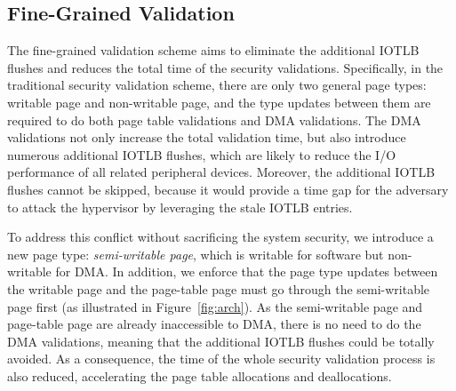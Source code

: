 \subsection{Fine-Grained Validation}\label{sec:fine-grained}
The fine-grained validation scheme aims to eliminate the additional IOTLB flushes and reduces the total time of the security validations.
Specifically, in the traditional security validation scheme, there are only two general page types: writable page and non-writable page,
and the type updates between them are required to do both page table validations and DMA validations.
The DMA validations not only increase the total validation time, but also introduce numerous additional IOTLB flushes, which are likely to reduce the I/O performance of all related peripheral devices.
Moreover, the additional IOTLB flushes cannot be skipped, because it would provide a time gap for the adversary to attack the hypervisor by leveraging the stale IOTLB entries.

To address this conflict without sacrificing the system security, we introduce a new page type: \emph{semi-writable page}, which is writable for software but non-writable for DMA.
In addition, we enforce that the page type updates between the writable page and the page-table page must go through the semi-writable page first (as illustrated in Figure~\ref{fig:arch}).
As the semi-writable page and page-table page are already inaccessible to DMA, there is no need to do the DMA validations, meaning that the additional IOTLB flushes could be totally avoided.
As a consequence, the time of the whole security validation process is also reduced, accelerating the page table allocations and deallocations.


